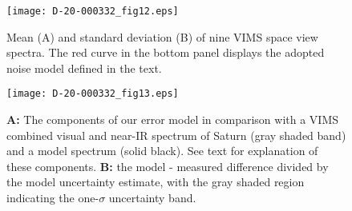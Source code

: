 \documentclass[article,11pt]{emulateapj}
\begin{document}
\begin{figure}[!htb]\centering
\texttt{[image: D-20-000332\_fig12.eps]}
\caption{Mean (A) and standard deviation (B) of
nine VIMS space view spectra.  The red curve in the bottom
panel displays the adopted noise model defined in the text.}\label{Fig:space}
\end{figure}

\begin{figure*}[!ht]\centering
\texttt{[image: D-20-000332\_fig13.eps]}
\caption{{\bf A:} The components of our error model in comparison with
  a VIMS combined visual and near-IR spectrum of Saturn (gray shaded
  band) and a model spectrum (solid black).  See text for
explanation of these components. {\bf B:} the model -
  measured difference divided by the model uncertainty estimate, with
  the gray shaded region indicating the one-$\sigma$ uncertainty band.}
\label{Fig:unc}
\end{figure*}
\end{document}
